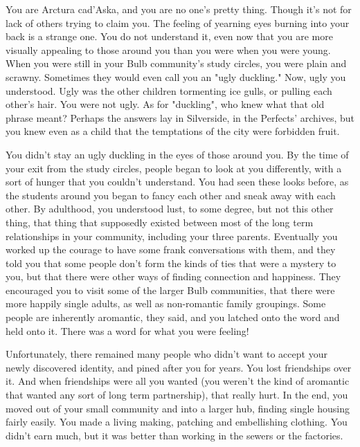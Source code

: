 \documentclass[char]{Silversiders}
\begin{document}
\name{\cBeauty{}}

You are Arctura cad'Aska, and you are no one's pretty thing. Though it's not for lack of others trying to claim you. The feeling of yearning eyes burning into your back is a strange one. You do not understand it, even now that you are more visually appealing to those around you than you were when you were young. When you were still in your Bulb community's study circles, you were plain and scrawny. Sometimes they would even call you an "ugly duckling." Now, ugly you understood. Ugly was the other children tormenting ice gulls, or pulling each other's hair. You were not ugly. As for "duckling", who knew what that old phrase meant? Perhaps the answers lay in Silverside, in the Perfects' archives, but you knew even as a child that the temptations of the city were forbidden fruit. 

You didn't stay an ugly duckling in the eyes of those around you. By the time of your exit from the study circles, people began to look at you differently, with a sort of hunger that you couldn't understand. You had seen these looks before, as the students around you began to fancy each other and sneak away with each other. By adulthood, you understood lust, to some degree, but not this other thing, that thing that supposedly existed between most of the long term relationships in your community, including your three parents. Eventually you worked up the courage to have some frank conversations with them, and they told you that some people don't form the kinds of ties that were a mystery to you, but that there were other ways of finding connection and happiness. They encouraged you to visit some of the larger Bulb communities, that there were more happily single adults, as well as non-romantic family groupings. Some people are inherently aromantic, they said, and you latched onto the word and held onto it. There was a word for what you were feeling!

Unfortunately, there remained many people who didn't want to accept your newly discovered identity, and pined after you for years. You lost friendships over it. And when friendships were all you wanted (you weren't the kind of aromantic that wanted any sort of long term partnership), that really hurt. In the end, you moved out of your small community and into a larger hub, finding single housing fairly easily. You made a living making, patching and embellishing clothing. You didn't earn much, but it was better than working in the sewers or the factories.
\end{document}
